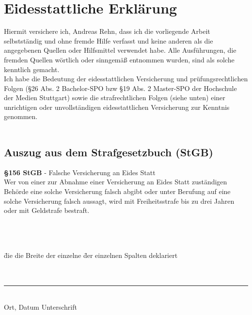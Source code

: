 \chapter*{Eidesstattliche Erklärung}
Hiermit versichere ich, Andreas Rehn, dass ich die vorliegende Arbeit selbstständig und ohne fremde Hilfe verfasst und keine anderen als die angegebenen Quellen oder Hilfsmittel verwendet habe. Alle Ausführungen, die fremden Quellen wörtlich oder sinngemäß entnommen wurden, sind als solche kenntlich gemacht.\\
Ich habe die Bedeutung der eidesstattlichen Versicherung und prüfungsrechtlichen Folgen (§26 Abs. 2 Bachelor-SPO \ac{bzw} §19 Abs. 2 Master-SPO der Hochschule der Medien Stuttgart) sowie die strafrechtlichen Folgen (siehe unten) einer unrichtigen oder unvollständigen eidesstattlichen Versicherung zur Kenntnis genommen.
\\
\\
\section*{Auszug aus dem Strafgesetzbuch (StGB)}
\textbf{§156 StGB} - Falsche Versicherung an Eides Statt\\
Wer von einer zur Abnahme einer Versicherung an Eides Statt zuständigen Behörde eine solche Versicherung falsch abgibt oder unter Berufung auf eine solche Versicherung falsch aussagt, wird mit Freiheitsstrafe bis zu drei Jahren oder mit Geldstrafe bestraft.
\\
\\
\\
\\
\begin{tabbing}
\jahr \= die die Breite der einzelne \= der einzelnen Spalten deklariert \kill %
\jahr \> \> \fullname \\
\\
\\
\noindent\rule{\textwidth}{1pt}\\
Ort, Datum \> \> Unterschrift \\
\end{tabbing}